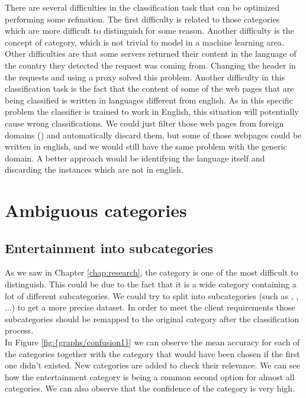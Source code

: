 
There are several difficulties in the classification task that can be optimized performing some refination. 
The first difficulty is related to those categories which are more difficult to distinguish for some reason. Another difficulty is the concept of  category, which is not trivial to
model in a machine learning area.
Other difficulties are that some servers returned their content in the language of the country they detected the request was coming from. Changing the header in the requests and using a proxy 
solved this problem.  
Another difficulty in this classification task is the fact that the content of some of the web pages that are being classified is written in languages different from english. 
As in this specific problem the classifier is trained to work in English, this situation will potentially cause wrong classifications. 
We could just filter those web pages from foreign domains () and automatically discard them, but some of those webpages could be written in english, and we would still have the same 
problem with the generic  domain.
A better approach would be identifying the language itself and discarding the instances  which are not in english.


\section{Ambiguous categories}


\subsection{Entertainment into subcategories}
As we saw in Chapter \ref{chap:research}, the category  is one of the most difficult to distinguish. This could be due to the fact that it is a wide category containing a lot of different
subcategories. We could try to split  into subcategories (such as , , ...) to get a more precise dataset. In order to meet the
client requirements those subcategories should be remapped to the original  category after the classification process. \\
In Figure \ref{fig:{graphs/confusion1}} we can observe the mean accuracy for each of the categories together with the category that would have been chosen if the first one didn't existed. New
categories are added to check their relevance. We can see how the entertainment category is being a common second option for almost all categories. We can also observe that the confidence of the 
 category is very high.

